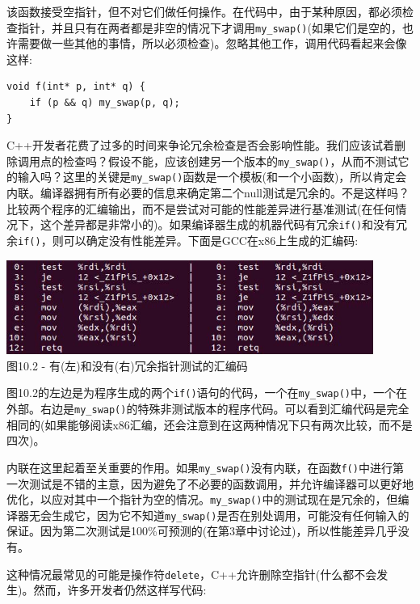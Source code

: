 该函数接受空指针，但不对它们做任何操作。在代码中，由于某种原因，都必须检查指针，并且只有在两者都是非空的情况下才调用\texttt{my\_swap()}(如果它们是空的，也许需要做一些其他的事情，所以必须检查)。忽略其他工作，调用代码看起来会像这样:

\begin{lstlisting}[style=styleCXX]
void f(int* p, int* q) {
	if (p && q) my_swap(p, q);
}
\end{lstlisting}

C++开发者花费了过多的时间来争论冗余检查是否会影响性能。我们应该试着删除调用点的检查吗？假设不能，应该创建另一个版本的\texttt{my\_swap()}，从而不测试它的输入吗？这里的关键是\texttt{my\_swap()}函数是一个模板(和一个小函数)，所以肯定会内联。编译器拥有所有必要的信息来确定第二个null测试是冗余的。不是这样吗？比较两个程序的汇编输出，而不是尝试对可能的性能差异进行基准测试(在任何情况下，这个差异都是非常小的)。如果编译器生成的机器代码有冗余\texttt{if()}和没有冗余\texttt{if()}，则可以确定没有性能差异。下面是GCC在x86上生成的汇编码:

\begin{center}
\includegraphics[width=0.9\textwidth]{content/3/chapter10/images/2.jpg}\\
图10.2 - 有(左)和没有(右)冗余指针测试的汇编码
\end{center}

图10.2的左边是为程序生成的两个\texttt{if()}语句的代码，一个在\texttt{my\_swap()}中，一个在外部。右边是\texttt{my\_swap()}的特殊非测试版本的程序代码。可以看到汇编代码是完全相同的(如果能够阅读x86汇编，还会注意到在这两种情况下只有两次比较，而不是四次)。 

内联在这里起着至关重要的作用。如果\texttt{my\_swap()}没有内联，在函数\texttt{f()}中进行第一次测试是不错的主意，因为避免了不必要的函数调用，并允许编译器可以更好地优化，以应对其中一个指针为空的情况。\texttt{my\_swap()}中的测试现在是冗余的，但编译器无会生成它，因为它不知道\texttt{my\_swap()}是否在别处调用，可能没有任何输入的保证。因为第二次测试是100\%可预测的(在第3章中讨论过)，所以性能差异几乎没有。

这种情况最常见的可能是操作符\texttt{delete}，C++允许删除空指针(什么都不会发生)。然而，许多开发者仍然这样写代码:

